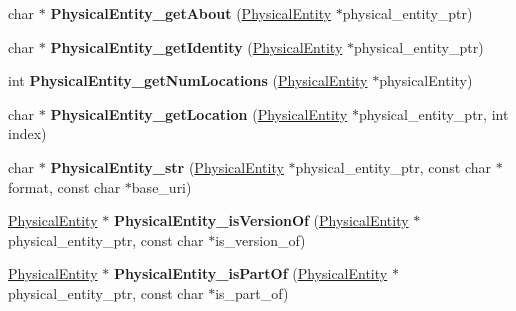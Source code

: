 \begin{DoxyCompactItemize}
\item 
\mbox{\label{namespaceomexmeta_a7f59e7b6f143fc61441cfb435262e1cb}} 
char $\ast$ {\bfseries Physical\+Entity\+\_\+get\+About} (\hyperlink{classomexmeta_1_1PhysicalEntity}{Physical\+Entity} $\ast$physical\+\_\+entity\+\_\+ptr)
\item 
\mbox{\label{namespaceomexmeta_aaa3ea01b3791ca3f7eb417457b07db6b}} 
char $\ast$ {\bfseries Physical\+Entity\+\_\+get\+Identity} (\hyperlink{classomexmeta_1_1PhysicalEntity}{Physical\+Entity} $\ast$physical\+\_\+entity\+\_\+ptr)
\item 
\mbox{\label{namespaceomexmeta_acc3cb121e83fea6627185101e64db8e9}} 
int {\bfseries Physical\+Entity\+\_\+get\+Num\+Locations} (\hyperlink{classomexmeta_1_1PhysicalEntity}{Physical\+Entity} $\ast$physical\+Entity)
\item 
\mbox{\label{namespaceomexmeta_a63e0d41567ae512005d7c9e50037e44e}} 
char $\ast$ {\bfseries Physical\+Entity\+\_\+get\+Location} (\hyperlink{classomexmeta_1_1PhysicalEntity}{Physical\+Entity} $\ast$physical\+\_\+entity\+\_\+ptr, int index)
\item 
\mbox{\label{namespaceomexmeta_a2ca2e5f41e156dc785bb858f82a088d4}} 
char $\ast$ {\bfseries Physical\+Entity\+\_\+str} (\hyperlink{classomexmeta_1_1PhysicalEntity}{Physical\+Entity} $\ast$physical\+\_\+entity\+\_\+ptr, const char $\ast$format, const char $\ast$base\+\_\+uri)
\item 
\mbox{\label{namespaceomexmeta_a91c343638a5190337fec566ac68666b8}} 
\hyperlink{classomexmeta_1_1PhysicalEntity}{Physical\+Entity} $\ast$ {\bfseries Physical\+Entity\+\_\+is\+Version\+Of} (\hyperlink{classomexmeta_1_1PhysicalEntity}{Physical\+Entity} $\ast$physical\+\_\+entity\+\_\+ptr, const char $\ast$is\+\_\+version\+\_\+of)
\item 
\mbox{\label{namespaceomexmeta_ad16c74638e4679527511519745b2826c}} 
\hyperlink{classomexmeta_1_1PhysicalEntity}{Physical\+Entity} $\ast$ {\bfseries Physical\+Entity\+\_\+is\+Part\+Of} (\hyperlink{classomexmeta_1_1PhysicalEntity}{Physical\+Entity} $\ast$physical\+\_\+entity\+\_\+ptr, const char $\ast$is\+\_\+part\+\_\+of)

\end{DoxyCompactItemize}
